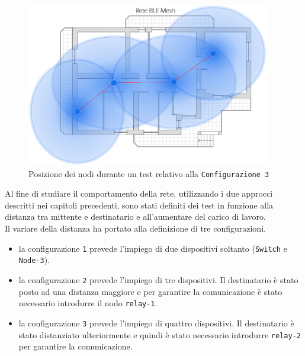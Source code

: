 \begin{figure}[!ht]
    \centering
    \includegraphics[width = 0.95\textwidth]{images/Rete_mesh_.png}
    \caption{Posizione dei nodi durante un test relativo alla \texttt{Configurazione 3}}
    \label{fig:rete_mesh}
\end{figure}

\noindent Al fine di studiare il comportamento della rete, utilizzando i due approcci descritti nei capitoli precedenti, sono stati definiti dei test in funzione alla distanza tra mittente e destinatario e all'aumentare del carico di lavoro.\\
Il variare della distanza ha portato alla definizione di tre configurazioni.
\begin{itemize}
    \item la configurazione \texttt{1} prevede l'impiego di due dispositivi soltanto (\texttt{Switch} e \texttt{Node-3}).
    \item la configurazione \texttt{2} prevede l'impiego di tre dispositivi. Il destinatario è stato posto ad una distanza maggiore e per garantire la comunicazione è stato necessario introdurre il nodo \texttt{relay-1}.
    \item la configurazione \texttt{3} prevede l'impiego di quattro dispositivi. Il destinatario è stato distanziato ulteriormente e quindi è stato necessario introdurre \texttt{relay-2} per garantire la comunicazione.
\end{itemize}

